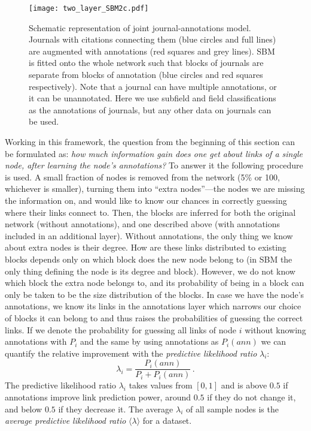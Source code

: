 \documentclass[a4paper,12pt]{article}
\begin{document}
\begin{figure}
  \centering
  \texttt{[image: two\_layer\_SBM2c.pdf]}
  \caption{Schematic representation of joint journal-annotations model.
Journals with citations connecting them (blue circles and full lines) are augmented with
annotations (red squares and grey lines). SBM is fitted onto the whole network such that blocks of journals
are separate from blocks of annotation (blue circles and red squares respectively).
Note that a journal can have multiple annotations, or it can be unannotated.
Here we use subfield and field classifications as the annotations of journals, but any other data on
journals can be used.
}
  \label{fig:layers}
\end{figure}


Working in this framework, the question from the beginning of this section
can be formulated as: 
\emph{how much information gain does one get about links of a single node, after learning the node's annotations?}
To answer it the following procedure is used. A small fraction of nodes is 
removed from the network (5\% or 100, whichever is smaller), turning them into 
``extra nodes''---the nodes we are missing the information on, and would like to know 
our chances in correctly guessing where their links connect to. Then, 
the blocks are inferred for both the original network (without annotations), and one
described above (with annotations included in an additional layer).
Without annotations, the only thing we know about extra nodes is their degree. How are 
these links distributed to existing blocks depends only on which block does the new node 
belong to (in SBM the only thing defining the node is its degree and block). 
However, we do not know which block the extra node belongs to, and its probability of being in a block can only be taken to be 
the size distribution of the blocks.
In case we have the node's annotations, we know its links in the annotations layer which 
narrows our choice of blocks it can belong to and thus raises the probabilities of 
guessing the correct links.
If we denote the probability for guessing all links of node $i$ without knowing 
annotations with $P_i$ and the same by using annotations as $P_i(ann)$ we can 
quantify the relative improvement with the \emph{predictive likelihood ratio} $\lambda_i$:
\begin{equation}
  \lambda_i = \frac{P_i(ann)}{P_i+P_i(ann)}\,.
\label{eq:lambda}
\end{equation}
The predictive likelihood ratio $\lambda_i$ takes values from $[0,1]$ and is above $0.5$ if annotations improve
link prediction power, around $0.5$ if they do not change it, and below $0.5$ if they 
decrease it. The average $\lambda_i$ of all sample nodes is the \emph{average predictive likelihood
ratio} $\langle\lambda\rangle$ for a dataset.
\end{document}

